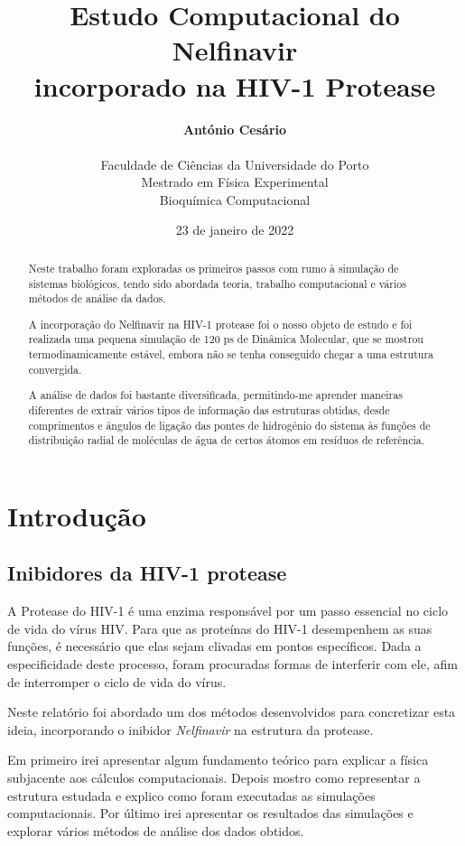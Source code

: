 \documentclass[12pt,a4paper]{article}
\title{\textbf{Estudo Computacional do Nelfinavir\\incorporado na HIV-1 Protease}}
\author{\textbf{António Cesário}\\\\%
	Faculdade de Ciências da Universidade do Porto\\%
	Mestrado em Física Experimental\\%
	Bioquímica Computacional%
	}
\date{23 de janeiro de 2022}
\begin{document}
	\maketitle
	\begin{abstract}
		Neste trabalho foram exploradas os primeiros passos com rumo à simulação de sistemas biológicos, tendo sido abordada teoria, trabalho computacional e vários métodos de análise da dados.
	
		A incorporação do Nelfinavir na HIV-1 protease foi o nosso objeto de estudo e foi realizada uma pequena simulação de 120 ps de Dinâmica Molecular, que se mostrou termodinamicamente estável, embora não se tenha conseguido chegar a uma estrutura convergida.
		
		A análise de dados foi bastante diversificada, permitindo-me aprender maneiras diferentes de extrair vários tipos de informação das estruturas obtidas, desde comprimentos e ângulos de ligação das pontes de hidrogénio do sistema às funções de distribuição radial de moléculas de água de certos átomos em resíduos de referência.
	\end{abstract}
	\newpage
	
\section{Introdução}
\subsection{Inibidores da HIV-1 protease}
	A Protease do HIV-1 é uma enzima responsável por um passo essencial no ciclo de vida do vírus HIV. Para que as proteínas do HIV-1 desempenhem as suas funções, é necessário que elas sejam clivadas em pontos específicos. Dada a especificidade deste processo, foram procuradas formas de interferir com ele, afim de interromper o ciclo de vida do vírus.
	
	Neste relatório foi abordado um dos métodos desenvolvidos para concretizar esta ideia, incorporando o inibidor \textit{Nelfinavir} na estrutura da protease.
	
	Em primeiro irei apresentar algum fundamento teórico para explicar a física subjacente aos cálculos computacionais. Depois mostro como representar a estrutura estudada e explico como foram executadas as simulações computacionais. Por último irei apresentar os resultados das simulações e explorar vários métodos de análise dos dados obtidos.
	
\end{document}
